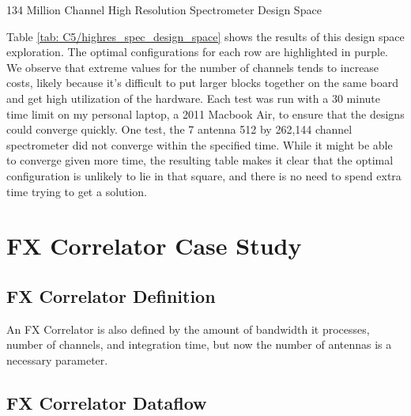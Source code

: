 \begin{table}

\caption{134 Million Channel High Resolution Spectrometer Design Space}
\label{tab: C5/highres_spec_design_space}
\end{table} 

%

Table \ref{tab: C5/highres_spec_design_space} shows the results of this design space exploration. 
The optimal configurations for each row are highlighted in purple.
We observe that extreme values for the number of channels tends to increase costs, likely because it's difficult to put larger blocks together on the same board and get high utilization of the hardware.
Each test was run with a 30 minute time limit on my personal laptop, a 2011 Macbook Air, to ensure that the designs could converge quickly.
One test, the 7 antenna 512 by 262,144 channel spectrometer did not converge within the specified time.
While it might be able to converge given more time, the resulting table makes it clear that the optimal configuration is unlikely to lie in that square, and there is no need to spend extra time trying to get a solution.









\section{FX Correlator Case Study}
\subsection{FX Correlator Definition}
An FX Correlator is also defined by the amount of bandwidth it processes, number of channels, and integration time, but now the number of antennas is a necessary parameter.

\subsection{FX Correlator Dataflow}

